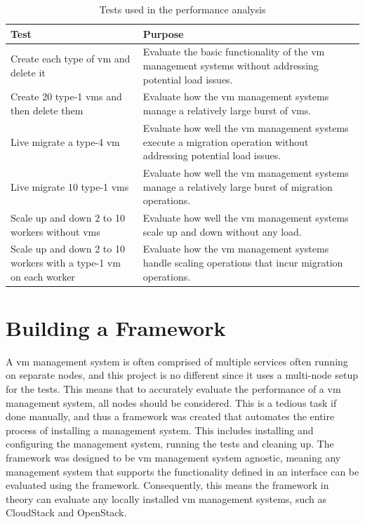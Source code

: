 \documentclass{kththesis}
\begin{document}
\begin{table}
    \caption{Tests used in the performance analysis}
    \centering
    \begin{tabular}{ |p{6cm}|p{6cm}| }
        \hline
        \textbf{Test} & \textbf{Purpose}\\
        \hline
        \hline
        Create each type of \Gls{vm} and delete it & Evaluate the basic functionality of the \Gls{vm} management systems without addressing potential load issues.\\
        \hline
        Create 20 type-1 \Glspl{vm} and then delete them & Evaluate how the \Gls{vm} management systems manage a relatively large burst of \Glspl{vm}.\\
        \hline
        Live migrate a type-4 \Gls{vm} & Evaluate how well the \Gls{vm} management systems execute a migration operation without addressing potential load issues.\\
        \hline
        Live migrate 10 type-1 \Glspl{vm} & Evaluate how well the \Gls{vm} management systems manage a relatively large burst of migration operations.\\
        \hline
        Scale up and down 2 to 10 workers without \Glspl{vm} & Evaluate how well the \Gls{vm} management systems scale up and down without any load.\\
        \hline
        Scale up and down 2 to 10 workers with a type-1 \Gls{vm} on each worker & Evaluate how the \Gls{vm} management systems handle scaling operations that incur migration operations.\\
        \hline
    \end{tabular}
    \label{table:performance-tests}
\end{table}

\section{Building a Framework}
A \Gls{vm} management system is often comprised of multiple services often running on separate nodes, and this project is no different since it uses a multi-node setup for the tests. This means that to accurately evaluate the performance of a \Gls{vm} management system, all nodes should be considered. This is a tedious task if done manually, and thus a framework was created that automates the entire process of installing a management system. This includes installing and configuring the management system, running the tests and cleaning up. The framework was designed to be \Gls{vm} management system agnostic, meaning any management system that supports the functionality defined in an interface can be evaluated using the framework. Consequently, this means the framework in theory can evaluate any locally installed \Gls{vm} management systems, such as CloudStack and OpenStack.
\end{document}
